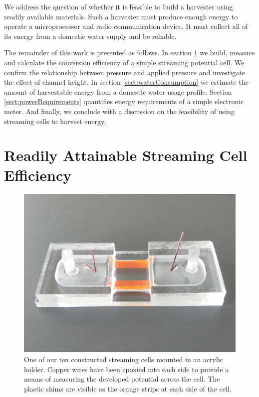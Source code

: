 \documentclass[10pt,final,journal]{IEEEtran}
\begin{document}
    We address the question of whether it is feasible to build a harvester using readily available materials.
    Such a harvester must produce enough energy to operate a microprocessor and radio communication device.
    It must collect all of its energy from a domestic water supply and be reliable.

    The remainder of this work is presented as follows.
    In section \ref{sect:streamingCell} we build, measure and calculate the conversion efficiency of a simple streaming potential cell.
    We confirm the relationship between pressure and applied pressure and investigate the effect of channel height.
    In section \ref{sect:waterConsumption} we estimate the amount of harvestable energy from a domestic water usage profile.
    Section \ref{sect:powerRequirements} quantifies energy requirements of a simple electronic meter.
    And finally, we conclude with a discussion on the feasibility of using streaming cells to harvest energy.

    \section{Readily Attainable Streaming Cell Efficiency} \label{sect:streamingCell}
    \begin{figure}
        \begin{center}
        \includegraphics[width=\linewidth]{Photo_streamingPotential_Assembly_Step3.JPG}
        \end{center}
        \caption{One of our ten constructed streaming cells mounted in an acrylic holder. Copper wires have been epoxied into each side to provide a means of measuring the developed potential across the cell. The plastic shims are visible as the orange strips at each side of the cell.}
        \label{fig:cell}
    \end{figure}
\end{document}
